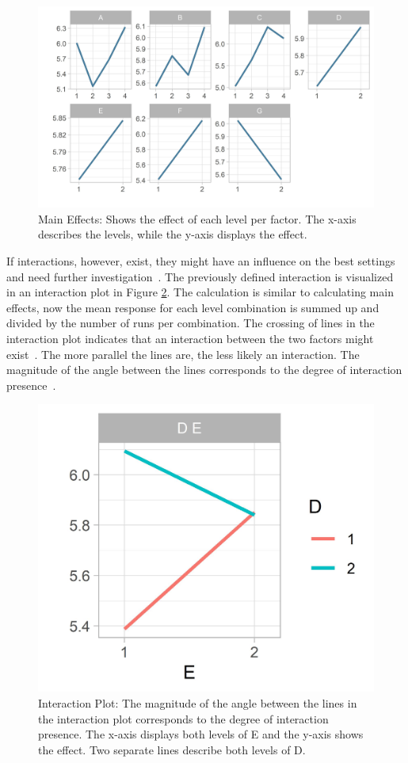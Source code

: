 \begin{figure}[ht] 
	\includegraphics[width=1\linewidth]{simulations/taguchi/plots/main_effects}
	\caption{Main Effects: Shows the effect of each level per factor. The x-axis describes the levels, while the y-axis displays the effect.}
	\label{fig:hyperparam_tuning:main_effects}
\end{figure}


 If interactions, however, exist, they might have an influence on the best settings and need further investigation~\cite{yang_design_2009}. The previously defined interaction is visualized in an interaction plot in Figure \ref{fig:hyperparam_tuning:interaction_plot}. The calculation is similar to calculating main effects, now the mean response for each level combination is summed up and divided by the number of runs per combination. The crossing of lines in the interaction plot indicates that an interaction between the two factors might exist~\cite{field_discovering_2012}. The more parallel the lines are, the less likely an interaction. The magnitude of the angle between the lines corresponds to the degree of interaction presence~\cite{roy_primer_1990}.

\begin{figure}[ht] 
	\centering
	\includegraphics[width=0.4\linewidth]{simulations/taguchi/plots/test_of_interaction}
	\caption{Interaction Plot: The magnitude of the angle between the lines in the interaction plot corresponds to the degree of interaction presence. The x-axis displays both levels of E and the y-axis shows the effect. Two separate lines describe both levels of D.}
	\label{fig:hyperparam_tuning:interaction_plot}
\end{figure}

